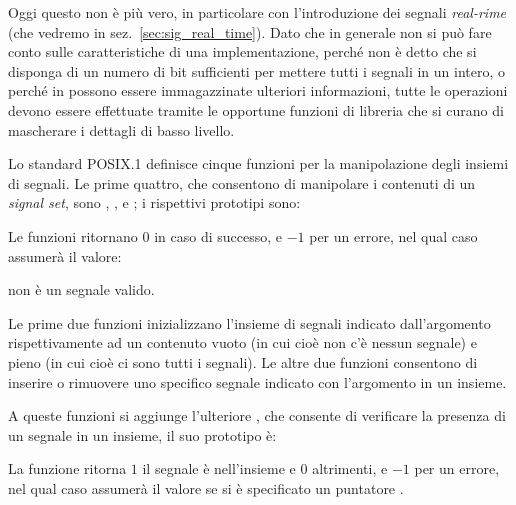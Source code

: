 Oggi questo non è più vero, in particolare con l'introduzione dei segnali
\textit{real-rime} (che vedremo in sez.~\ref{sec:sig_real_time}).  Dato che in
generale non si può fare conto sulle caratteristiche di una implementazione,
perché non è detto che si disponga di un numero di bit sufficienti per mettere
tutti i segnali in un intero, o perché in  possono essere
immagazzinate ulteriori informazioni, tutte le operazioni devono essere
effettuate tramite le opportune funzioni di libreria che si curano di
mascherare i dettagli di basso livello.

Lo standard POSIX.1 definisce cinque funzioni per la manipolazione degli
insiemi di segnali. Le prime quattro, che consentono di manipolare i contenuti
di un \textit{signal set}, sono , ,
 e ; i rispettivi prototipi sono:

\begin{funcproto}{
}

{Le funzioni ritornano $0$ in caso di successo, e $-1$ per un errore, nel qual
  caso  assumerà il valore:
  \begin{errlist}
  \item[\errcode{EINVAL}]  non è un segnale valido.
  \end{errlist}
}
\end{funcproto}

Le prime due funzioni inizializzano l'insieme di segnali indicato
dall'argomento  rispettivamente ad un contenuto vuoto (in cui cioè
non c'è nessun segnale) e pieno (in cui cioè ci sono tutti i segnali). Le
altre due funzioni consentono di inserire o rimuovere uno specifico segnale
indicato con l'argomento  in un insieme. 

A queste funzioni si aggiunge l'ulteriore , che consente di
verificare la presenza di un segnale in un insieme, il suo prototipo è:

\begin{funcproto}{
}

{La funzione ritorna $1$ il segnale è nell'insieme e $0$ altrimenti, e $-1$
  per un errore, nel qual caso  assumerà il valore 
  se si è specificato un puntatore .}
\end{funcproto}

